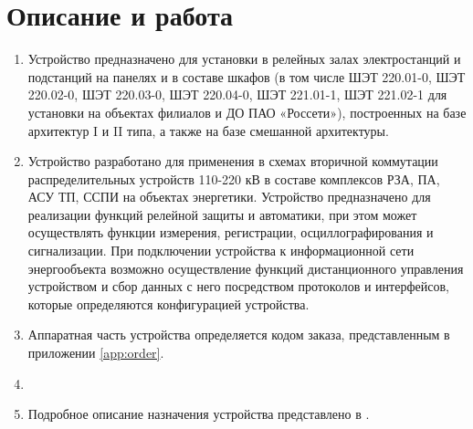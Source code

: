 \color{unidarkgreen}\section[Описание и работа]{Описание и работа}
\color{black}

\color{black}

\begin{enumerate}

\item
Устройство предназначено для установки в релейных залах электростанций и подстанций на панелях и в составе шкафов (в том числе ШЭТ 220.01-0, ШЭТ 220.02-0, ШЭТ 220.03-0, ШЭТ 220.04-0, ШЭТ 221.01-1, ШЭТ 221.02-1 для установки на объектах филиалов и ДО ПАО «Россети»), построенных на базе архитектур I и II типа, а также на базе смешанной архитектуры.
\item
Устройство разработано для применения в схемах вторичной коммутации распределительных устройств 110-220 кВ в составе комплексов РЗА, ПА, АСУ ТП, ССПИ на объектах энергетики.
Устройство предназначено для реализации функций релейной защиты и автоматики, при этом может осуществлять функции измерения, регистрации, осциллографирования и сигнализации.
При подключении устройства к информационной сети энергообъекта возможно осуществление функций дистанционного управления устройством и сбор данных с него посредством протоколов и интерфейсов, которые определяются конфигурацией устройства.

\item 
Аппаратная часть устройства определяется кодом заказа, представленным в приложении \ref{app:order}.

\item
{}

\item
Подробное описание назначения устройства представлено в \ManualUnitGeneral.

\end{enumerate}

